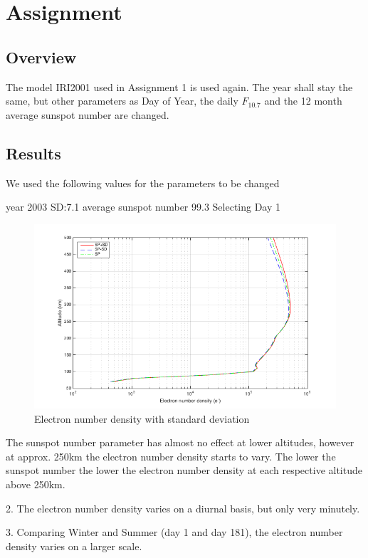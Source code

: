 \section{Assignment}
\subsection{Overview}
The model IRI2001 used in Assignment 1 is used again. The year shall stay the same, but other parameters as Day of Year, the daily $F_{10.7}$ and the 12 month average sunspot number are changed.
\subsection{Results}
We used the following values for the parameters to be changed

year 2003
SD:7.1
average sunspot number 99.3
Selecting Day 1

\begin{figure}[h]
	\centering
	\includegraphics[width=\linewidth]{images/ass3plot1}	
	\caption{Electron number density with standard deviation}
	\label{fig:ass3Plot1}
\end{figure}

The sunspot number parameter has almost no effect at lower altitudes, however at approx. 250km the electron number density starts to vary. The lower the sunspot number the lower the electron number density at each respective altitude above 250km.

2. The electron number density varies on a diurnal basis, but only very minutely. 

3. Comparing Winter and Summer (day 1 and day 181), the electron number density varies on a larger scale.
